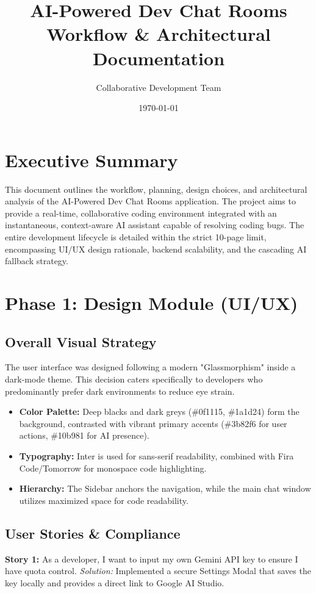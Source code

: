 \documentclass[12pt, a4paper]{article}
\title{\textbf{AI-Powered Dev Chat Rooms \\ Workflow \& Architectural Documentation}}
\author{Collaborative Development Team}
\date{\today}
\begin{document}
\maketitle
\tableofcontents
\newpage

\section{Executive Summary}
This document outlines the workflow, planning, design choices, and architectural analysis of the AI-Powered Dev Chat Rooms application. The project aims to provide a real-time, collaborative coding environment integrated with an instantaneous, context-aware AI assistant capable of resolving coding bugs. The entire development lifecycle is detailed within the strict 10-page limit, encompassing UI/UX design rationale, backend scalability, and the cascading AI fallback strategy.

\section{Phase 1: Design Module (UI/UX)}
\subsection{Overall Visual Strategy}
The user interface was designed following a modern "Glassmorphism" inside a dark-mode theme. This decision caters specifically to developers who predominantly prefer dark environments to reduce eye strain.
\begin{itemize}[label=\textbullet]
    \item \textbf{Color Palette:} Deep blacks and dark greys (\#0f1115, \#1a1d24) form the background, contrasted with vibrant primary accents (\#3b82f6 for user actions, \#10b981 for AI presence).
    \item \textbf{Typography:} Inter is used for sans-serif readability, combined with Fira Code/Tomorrow for monospace code highlighting.
    \item \textbf{Hierarchy:} The Sidebar anchors the navigation, while the main chat window utilizes maximized space for code readability.
\end{itemize}

\subsection{User Stories \& Compliance}
\textbf{Story 1:} As a developer, I want to input my own Gemini API key to ensure I have quota control.
\textit{Solution:} Implemented a secure Settings Modal that saves the key locally and provides a direct link to Google AI Studio.
\end{document}
